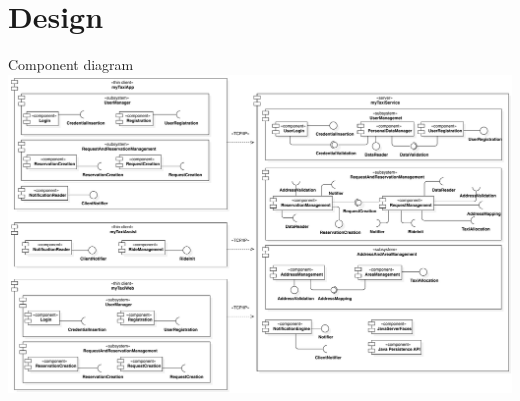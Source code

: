    \section{Design}




\begin{frame}{Component diagram}
	\includegraphics[width=\textwidth ]{img/ComponentView__ComponentDiagram_1}
\end{frame}





